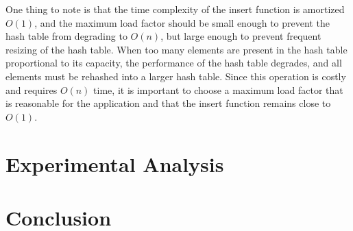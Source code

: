 \documentclass{article}
\begin{document}
One thing to note is that the time complexity of the insert function is amortized $O(1)$, and the maximum load factor should be small enough to prevent the hash table from degrading to $O(n)$, but large enough to prevent frequent resizing of the hash table.
When too many elements are present in the hash table proportional to its capacity, the performance of the hash table degrades, and all elements must be rehashed into a larger hash table.
Since this operation is costly and requires $O(n)$ time, it is important to choose a maximum load factor that is reasonable for the application and that the insert function remains close to $O(1)$.

\section{Experimental Analysis}


\section{Conclusion}
\end{document}
